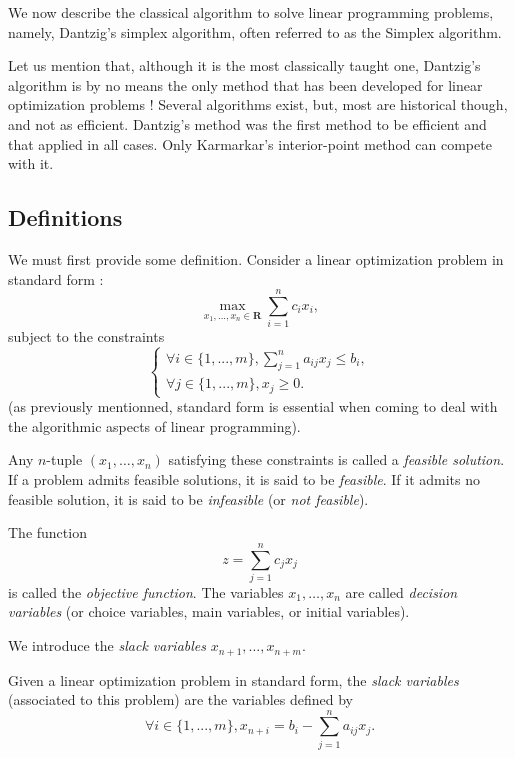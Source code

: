 We now describe the classical algorithm to solve linear programming problems, namely, Dantzig's simplex algorithm, often referred to as the Simplex algorithm.

Let us mention that, although it is the most classically taught one, Dantzig's algorithm is by no means the only method that has been developed for linear optimization problems ! Several algorithms exist, but, most are historical though, and not as efficient. Dantzig's method was the first method to be efficient and that applied in all cases. Only Karmarkar's interior-point method \cite{karmarkar1984} can compete with it.

\subsection{Definitions}

We must first provide some definition. Consider a linear optimization problem in standard form : 
\[
    \max_{x_1, ..., x_n \in \mathbf R}\sum_{i=1}^n c_i x_i,
\]
subject to the constraints
\[
    \left\{
        \begin{array}{l}
            \forall i \in \{ 1, ..., m \}, \sum_{j=1}^n a_{ij} x_j \leqslant b_i, \\
            \forall j \in \{ 1, ..., m \}, x_j \geqslant 0.
        \end{array}
    \right.
\]
(as previously mentionned, standard form is essential when coming to deal with the algorithmic aspects of linear programming).

\begin{definition}
    Any $n$-tuple $(x_1,\dots,x_n)$ satisfying these constraints is called a \emph{feasible solution}.
    If a problem admits feasible solutions, it is said to be \emph{feasible}.
    If it admits no feasible solution, it is said to be \emph{infeasible} (or \emph{not feasible}).
\end{definition}

\begin{definition}
    The function
    \[
    z = \sum_{j=1}^n c_j x_j
    \]
    is called the \emph{objective function}.
    The variables $x_1,\dots,x_n$ are called \emph{decision variables} (or choice variables, main variables, or initial variables).
\end{definition}

We introduce the \emph{slack variables} $ x_{n+1},\dots,x_{n+m} $.

\begin{definition}
    Given a linear optimization problem in standard form, the \textit{slack variables} (associated to this problem) are the variables defined by
    \[
        \forall i \in \{ 1, ..., m \}, x_{n+i} = b_i - \sum_{j=1}^n a_{ij}x_j.
    \]
\end{definition}

